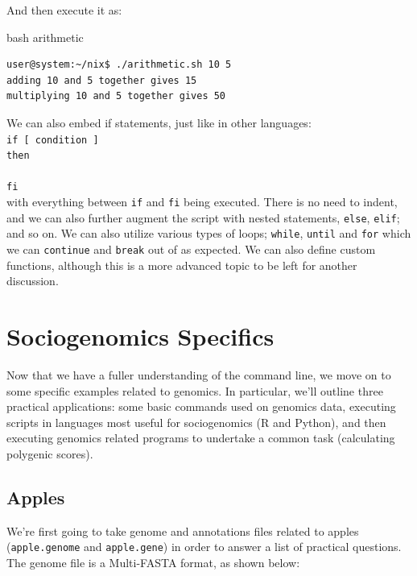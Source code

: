 \documentclass[11pt]{article}
\begin{document}
\noindent
And then execute it as:\\

\begin{listing}[H]
\caption{bash arithmetic}\vspace{-0.1in}
\begin{verbatim}
user@system:~/nix$ ./arithmetic.sh 10 5
adding 10 and 5 together gives 15
multiplying 10 and 5 together gives 50
\end{verbatim}
\end{listing}
\noindent
We can also embed if statements, just like in other languages:\\

\noindent
\texttt{if [ condition ]\\
then\\
\\
fi}\\

\noindent with everything between \texttt{if} and \texttt{fi} being executed. There is no need to indent, and we can also further augment the script with nested statements, \texttt{else}, \texttt{elif}; and so on. We can also utilize various types of loops; \texttt{while}, \texttt{until} and \texttt{for} which we can \texttt{continue} and \texttt{break} out of as expected. We can also define custom functions, although this is a more advanced topic to be left for another discussion.


\section{Sociogenomics Specifics}

Now that we have a fuller understanding of the command line, we move on to some specific examples related to genomics. In particular, we'll outline three practical applications: some basic commands used on genomics data, executing scripts in languages most useful for sociogenomics (R and Python), and then executing genomics related programs to undertake a common task (calculating polygenic scores).

\subsection{Apples}

We're first going to take genome and annotations files related to apples (\texttt{apple.genome} and \texttt{apple.gene}) in order to answer a list of practical questions. The genome file is a Multi-FASTA format, as shown below:\\
\end{document}
